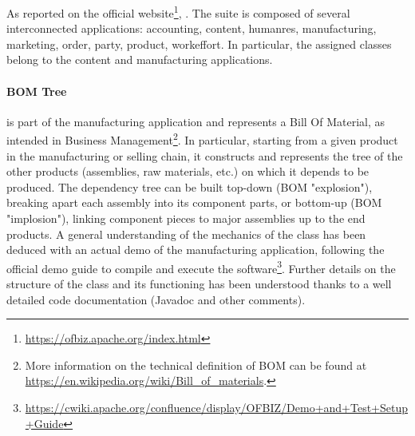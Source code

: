 As reported on the official website\footnote{\url{https://ofbiz.apache.org/index.html}}, .\newline
The suite is composed of several interconnected applications:
accounting,
content,
humanres,
manufacturing,
marketing,
order,
party,
product,
workeffort.\newline
In particular, the assigned classes belong to the content and manufacturing applications.

\paragraph{BOM Tree} is part of the manufacturing application and represents a Bill Of Material, as intended in Business Management\footnote{More information on the technical definition of BOM can be found at \url{https://en.wikipedia.org/wiki/Bill_of_materials}.}. In particular, starting from a given product in the manufacturing or selling chain, it constructs and represents the tree of the other products (assemblies, raw materials, etc.) on which it depends to be produced. The dependency tree can be built top-down (BOM "explosion"), breaking apart each assembly into its component parts, or bottom-up (BOM "implosion"), linking component pieces to major assemblies up to the end products.\newline
A general understanding of the mechanics of the class has been deduced with an actual demo of the manufacturing application, following the official demo guide to compile and execute the software\footnote{\url{https://cwiki.apache.org/confluence/display/OFBIZ/Demo+and+Test+Setup+Guide}}. Further details on the structure of the class and its functioning has been understood thanks to a well detailed code documentation (Javadoc and other comments).


